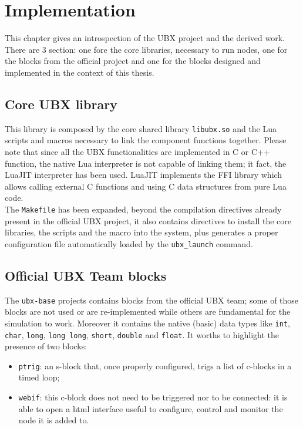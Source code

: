 \chapter{Implementation}
\label{ch:implementation}
This chapter gives an introspection of the UBX project and the derived work. There are 3 section: one fore the core libraries, necessary to run nodes, one for the blocks from the official project and one for the blocks designed and implemented in the context of this thesis.

\section{Core UBX library}
This library is composed by the core shared library \texttt{libubx.so} and the Lua scripts and macros necessary to link the component functions together. Please note that since all the UBX functionalities are implemented in C or C++ function, the native Lua interpreter is not capable of linking them; it fact, the LuaJIT interpreter has been used.
LuaJIT implements the FFI library which allows calling external C functions and using C data structures from pure Lua code\autocite{bib:luaffi}.\\
The \texttt{Makefile} has been expanded, beyond the compilation directives already present in the official UBX project, it also contains directives to install the core libraries, the scripts and the macro into the system, plus generates a proper configuration file automatically loaded by the \texttt{ubx\_launch} command.

\section{Official UBX Team blocks}
The \texttt{ubx-base} projects contains blocks from the official UBX team; some of those blocks are not used or are re-implemented while others are fundamental for the simulation to work. Moreover it contains the native (basic) data types like \texttt{int}, \texttt{char}, \texttt{long}, \texttt{long long}, \texttt{short}, \texttt{double} and \texttt{float}.
It worths to highlight the presence of two blocks:
\begin{itemize}
	\item \texttt{ptrig}: an s-block that, once properly configured, trigs a list of c-blocks in a timed loop;
	\item \texttt{webif}: this c-block does not need to be triggered nor to be connected: it is able to open a html interface useful to configure, control and monitor the node it is added to.
\end{itemize}

